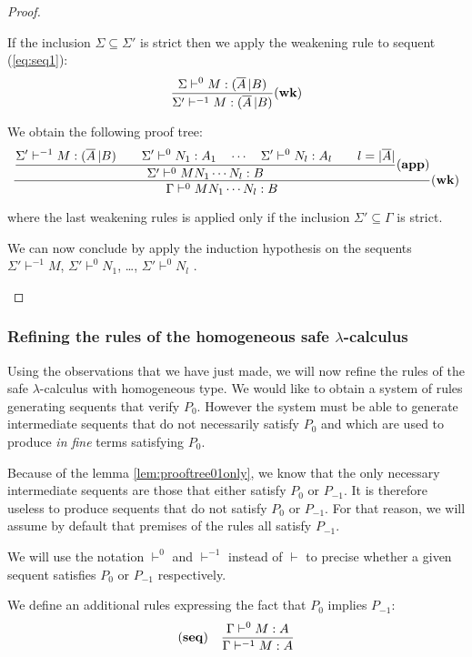 \begin{proof}
\begin{itemize}
If the inclusion $\Sigma \subseteq \Sigma'$ is strict then we apply the weakening rule to sequent (\ref{eq:seq1}):
$$ \frac{\displaystyle \Sigma \vdash^0 M : (\overline{A} \, | B)}{\Sigma' \vdash^{-1} M : (\overline{A} \, | B)} \mathbf{(wk)} $$

We obtain the following proof tree:
$$  \frac{\displaystyle 
        \frac{\displaystyle 
            { \Sigma' \vdash^{-1} M : (\overline{A} \, | B)
            \qquad
            \Sigma' \vdash^0 N_1 : A_1 \quad \cdots \quad \Sigma' \vdash^0 N_{l} : A_l \qquad l = |\overline{A}|
            }
        }{
            \Sigma' \vdash^0 M N_1 \cdots N_{l} : B
        } \mathbf{(app)}
    }{
         \Gamma \vdash^0 M N_1 \cdots N_{l} : B
    } \mathbf{(wk)}
$$

where the last weakening rules is applied only if the inclusion $\Sigma' \subseteq \Gamma$ is strict.

We can now conclude by apply the induction hypothesis on the sequents $\Sigma' \vdash^{-1} M$,
$\Sigma' \vdash^0 N_1$, \ldots, $\Sigma' \vdash^0 N_l$ .
\end{itemize}
\end{proof}

\subsubsection{Refining the rules of the homogeneous safe $\lambda$-calculus}

Using the observations that we have just made, we will now refine the rules
of the safe $\lambda$-calculus with homogeneous type. We would like to obtain a system
of rules generating sequents that verify $P_0$. However the system must be able to generate intermediate
sequents that do not necessarily satisfy $P_0$ and which are used to produce \emph{in fine} terms satisfying $P_0$.

Because of the lemma \ref{lem:prooftree01only}, we know that the only necessary intermediate sequents
are those that either satisfy $P_0$ or $P_{-1}$. It is therefore useless to produce sequents that do not satisfy
$P_0$ or $P_{-1}$. For that reason, we will assume by default that premises of the rules all satisfy $P_{-1}$.

We will use the notation $\vdash^0$ and $\vdash^{-1}$ instead of $\vdash$ to precise
whether a given sequent satisfies $P_0$ or $P_{-1}$ respectively.

We define an additional rules expressing the fact that $P_0$ implies $P_{-1}$:
$$ \mathbf{(seq)} \quad \frac{\displaystyle \Gamma \vdash^{0} M : A}{\Gamma \vdash^{-1} M : A} $$

